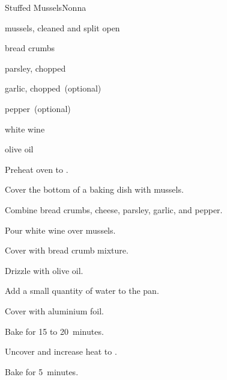 \begin{recipe}{Stuffed Mussels}{Nonna}{}

\begin{ingredients}
\item mussels, cleaned and split open
\item bread crumbs
\item {}
\item parsley, chopped
\item garlic, chopped~(optional)
\item pepper~(optional)
\item white wine
\item olive oil
\end{ingredients}

\begin{directions}
\item Preheat oven to .
\item Cover the bottom of a baking dish with mussels.
\item Combine bread crumbs, cheese, parsley, garlic, and pepper.
\item Pour white wine over mussels.
\item Cover with bread crumb mixture.
\item Drizzle with olive oil.
\item Add a small quantity of water to the pan.
\item Cover with aluminium foil.
\item Bake for 15 to 20~minutes.
\item Uncover and increase heat to .
\item Bake for 5~minutes.
\end{directions}

\end{recipe}
